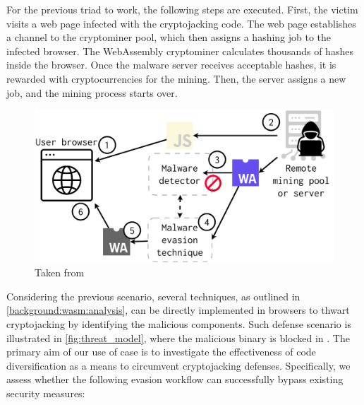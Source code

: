 For the previous triad to work, the following steps are executed.
First, the victim visits a web page infected with the cryptojacking code. 
The web page establishes a channel to the cryptominer pool, which then assigns a hashing job to the infected browser. 
The WebAssembly cryptominer calculates thousands of hashes inside the browser. 
Once the malware server receives acceptable hashes, it is rewarded with cryptocurrencies for the mining. 
Then, the server assigns a new job, and the mining process starts over.

\begin{figure}
    \centering
    \includegraphics[width=0.8\linewidth]{figures/threat_model.pdf}
    \caption{Taken from \cite{EVASION}}
    \label{fig:threat_model}
\end{figure}


Considering the previous scenario, several techniques, as outlined in \autoref{background:wasm:analysis}, can be directly implemented in browsers to thwart cryptojacking by identifying the malicious \Wasm components. 
Such defense scenario is illustrated in \autoref{fig:threat_model}, where the \Wasm malicious binary is blocked in .
The primary aim of our use of case is to investigate the effectiveness of code diversification as a means to circumvent cryptojacking defenses. 
Specifically, we assess whether the following evasion workflow can successfully bypass existing security measures:

